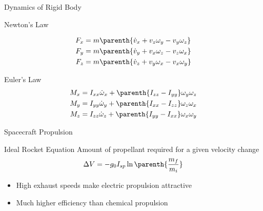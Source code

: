 \begin{frame}[noframenumbering]
\end{frame}%

\begin{frame}[t,noframenumbering]{Dynamics of Rigid Body} %
    \begin{block}{Newton's Law}
        
        \begin{align*}
            F_x &= m \parenth{\dot{v}_x + v_z \omega_y - v_y \omega_z} \\
            F_y &= m \parenth{\dot{v}_y + v_x \omega_z - v_z \omega_x} \\
            F_z &= m \parenth{\dot{v}_z + v_y \omega_x - v_x \omega_y} \\
        \end{align*}
    \end{block}
    
    \begin{block}{Euler's Law}
        \begin{align*}
            {M}_x &= I_{xx} \dot{\omega}_x + \parenth{I_{zz}-I_{yy}} \omega_y \omega_z \\
            {M}_y &= I_{yy} \dot{\omega}_y + \parenth{I_{xx}-I_{zz}} \omega_z \omega_x \\
            {M}_z &= I_{zz} \dot{\omega}_z + \parenth{I_{yy}-I_{xx}} \omega_x \omega_y \\
        \end{align*}
    \end{block}
\end{frame} %

\begin{frame}[noframenumbering]{Spacecraft Propulsion}\label{slide:propulsion}%
\begin{block}{Ideal Rocket Equation}
    Amount of propellant required for a given velocity change
    \[
        \Delta V = - g_0 I_{sp} \ln\parenth{\frac{m_f}{m_i}}
    \]
\end{block}

\begin{itemize}
    \item High exhaust speeds make electric propulsion attractive
    \item Much higher efficiency than chemical propulsion
\end{itemize}
\hyperlink{slide:lowthrust_vehicles}{}

\end{frame} %

